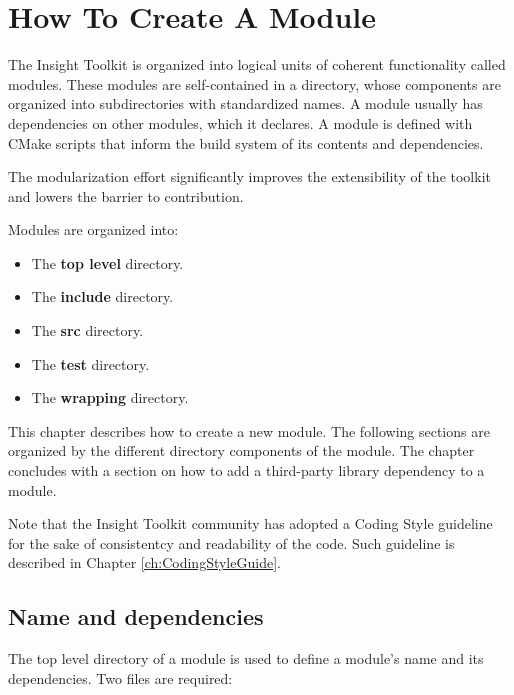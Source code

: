 \chapter{How To Create A Module}
\label{chapter:CreateAModule}

The Insight Toolkit is organized into logical units of coherent functionality called
modules. These modules are self-contained in a directory, whose components
are organized into subdirectories with standardized names. A module usually has
dependencies on other modules, which it declares. A module is defined with
CMake scripts that inform the build system of its contents and dependencies.

The modularization effort significantly improves the extensibility of the
toolkit and lowers the barrier to contribution.

Modules are organized into:

\begin{itemize}
  \item The \textbf{top level} directory.

  \item The \textbf{include} directory.

  \item The \textbf{src} directory.

  \item The \textbf{test} directory.

  \item The \textbf{wrapping} directory.
\end{itemize}

This chapter describes how to create a new module. The following sections  are
organized by the different directory components of the module. The chapter
concludes with a section on how to add a third-party library dependency to a
module.

Note that the Insight Toolkit community has adopted a Coding Style guideline
for the sake of consistentcy and readability of the code. Such guideline is
described in Chapter \ref{ch:CodingStyleGuide}.

\section{Name and dependencies}
\label{sec:NameAndDependencies}

The top level directory of a module is used to define a module's name and its
dependencies. Two files are required:

